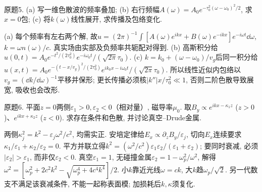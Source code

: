 \begin{exercise}
原题5. (a) 写一维色散波的频率叠加; (b) 右行频幅$A(\omega)=A_0e^{-\tau_0^2(\omega-\omega_0)^2/2}$, 求$x=0$包; (c) 将$k(\omega)$线性展开, 求传播及包络变化.
\end{exercise}
\begin{solution}
(a) 每个频率有左右两个解, 故$u=(2\pi)^{-1}\int[A(\omega)e^{ikx}+B(\omega)e^{-ikx}]e^{-i\omega t}\dd\omega$, $k=\omega n(\omega)/c$. 真实场由实部及负频率共轭配对得到. (b) 高斯积分给$u(0,t)=A_0e^{-t^2/(2\tau_0^2)}e^{-i\omega_0t}/(\sqrt{2\pi}\tau_0)$. (c) $k=k_0+(\omega-\omega_0)/v_g$后同一积分给
$u(x,t)=A_0e^{-(t-x/v_g)^2/(2\tau_0^2)}e^{ik_0x-i\omega_0t}/(\sqrt{2\pi}\tau_0)$. 所以线性近似内包络以$v_g=(\dd k/\dd\omega)^{-1}$平移并保形; 更长传播必须核$|k''|x/\tau_0^2\ll1$, 否则二阶色散导致展宽, 吸收也会改形.
\end{solution}
\begin{exercise}
原题6. 平面$z=0$两侧$\varepsilon_1>0,\varepsilon_2<0$（相对量）, 磁导率$\mu_0$. 取$B_y\propto e^{ikx-\kappa_1z}$ ($z>0$)、$e^{ikx+\kappa_2z}$ ($z<0$). 求存在条件和色散, 并讨论真空–Drude金属.
\end{exercise}
\begin{solution}
两侧$\kappa_j^2=k^2-\varepsilon_j\omega^2/c^2$, 均需实正. 安培定律给$E_x\propto\partial_zB_y/\varepsilon_j$, 切向$E_x$连续要求$\kappa_1/\varepsilon_1+\kappa_2/\varepsilon_2=0$. 平方并联立得$k^2=(\omega^2/c^2)\varepsilon_1\varepsilon_2/(\varepsilon_1+\varepsilon_2)$; 要同时衰减, 必须$|\varepsilon_2|>\varepsilon_1$, 而非仅$\varepsilon_2<0$. 真空$\varepsilon_1=1$, 无碰撞金属$\varepsilon_2=1-\omega_p^2/\omega^2$, 解得
$\omega^2=[\omega_p^2+2c^2k^2-\sqrt{\omega_p^4+4c^4k^4}]/2$. 小$k$靠近光线$\omega=ck$, 大$k$趋$\omega_p/\sqrt2$. 另一代数支不满足该衰减条件, 不能一起称表面模; 加损耗后$k,\kappa$须复化.
\end{solution}
